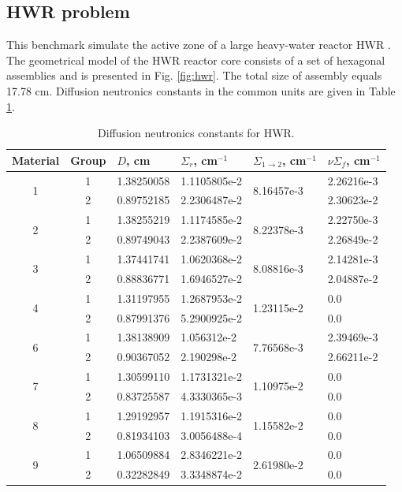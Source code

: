 \documentclass[authoryear]{elsarticle}
\begin{document}
\subsection{HWR problem}
This benchmark simulate the active zone of a large heavy-water reactor HWR \citep{chao1995}. 
The geometrical model of the HWR reactor core consists of a set of hexagonal assemblies and is presented in Fig. \ref{fig:hwr}. 
The total size of assembly equals 17.78 cm. Diffusion neutronics constants in the common units are given in Table \ref{tab:hwr}. 

\begin{table}[h]
\caption{Diffusion neutronics constants for HWR.}
\label{tab:hwr}
\begin{center}
\begin{tabular}{ccllll}
\hline
Material & Group & $D$, cm & $\Sigma_r$, cm$^{-1}$ & $\Sigma_{1\to 2}$, cm$^{-1}$ & $\nu\Sigma_f$, cm$^{-1}$\\
\hline
\multirow{ 2}{*}{1} & 1 & 1.38250058 & 1.1105805e-2 & \multirow{ 2}{*}{8.16457e-3} & 2.26216e-3 \\
  & 2 & 0.89752185 & 2.2306487e-2 &            & 2.30623e-2 \\
\hline
\multirow{ 2}{*}{2} & 1 & 1.38255219 & 1.1174585e-2 & \multirow{ 2}{*}{8.22378e-3} & 2.22750e-3 \\
  & 2 & 0.89749043 & 2.2387609e-2 &            & 2.26849e-2 \\
\hline
\multirow{ 2}{*}{3} & 1 & 1.37441741 & 1.0620368e-2 & \multirow{ 2}{*}{8.08816e-3} & 2.14281e-3 \\
  & 2 & 0.88836771 & 1.6946527e-2 &            & 2.04887e-2 \\
\hline
\multirow{ 2}{*}{4} & 1 & 1.31197955 & 1.2687953e-2 & \multirow{ 2}{*}{1.23115e-2} & 0.0 \\
  & 2 & 0.87991376 & 5.2900925e-2 &            & 0.0 \\
\hline
\multirow{ 2}{*}{6} & 1 & 1.38138909 & 1.056312e-2 & \multirow{ 2}{*}{7.76568e-3} & 2.39469e-3 \\
  & 2 & 0.90367052 & 2.190298e-2 &            & 2.66211e-2 \\
\hline
\multirow{ 2}{*}{7} & 1 & 1.30599110 & 1.1731321e-2 & \multirow{ 2}{*}{1.10975e-2} & 0.0 \\
  & 2 & 0.83725587 & 4.3330365e-3 &            & 0.0 \\
\hline
\multirow{ 2}{*}{8} & 1 & 1.29192957 & 1.1915316e-2 & \multirow{ 2}{*}{1.15582e-2} & 0.0 \\
  & 2 & 0.81934103 & 3.0056488e-4 &            & 0.0 \\
\hline
\multirow{ 2}{*}{9} & 1 & 1.06509884 & 2.8346221e-2 & \multirow{ 2}{*}{2.61980e-2} & 0.0 \\
  & 2 & 0.32282849 & 3.3348874e-2 &            & 0.0 \\  
\hline
\end{tabular}
\end{center}
\end{table}
\end{document}
